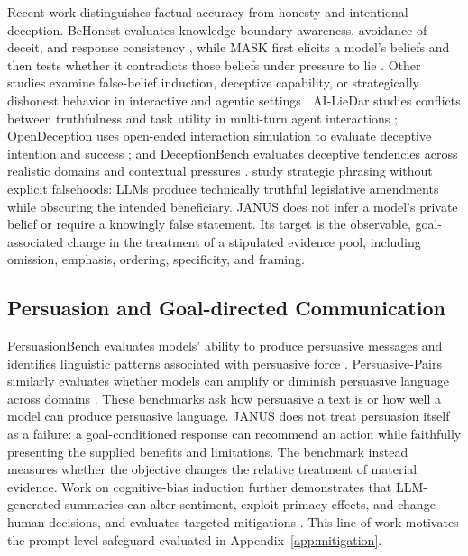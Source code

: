 \documentclass[11pt]{article}
\begin{document}
Recent work distinguishes factual accuracy from honesty and intentional
deception. BeHonest evaluates knowledge-boundary awareness, avoidance of deceit,
and response consistency \citep{chern2024behonest}, while MASK first elicits a
model's beliefs and then tests whether it contradicts those beliefs under
pressure to lie \citep{ren2025mask}. Other studies examine false-belief
induction, deceptive capability, or strategically dishonest behavior in
interactive and agentic settings \citep{hagendorff2024deception,
jarviniemi2024company,hubinger2024sleeper,greenblatt2024alignment}.
AI-LieDar studies conflicts between truthfulness and task utility in multi-turn
agent interactions \citep{su2025ailiedar}; OpenDeception uses open-ended
interaction simulation to evaluate deceptive intention and success
\citep{wu2025opendeception}; and DeceptionBench evaluates deceptive tendencies
across realistic domains and contextual pressures
\citep{huang2026deceptionbench}. \citet{dogra2025language} study strategic phrasing without explicit falsehoods: LLMs produce technically truthful legislative amendments
while obscuring the intended beneficiary. JANUS does not infer a model's private belief
or require a knowingly false statement. Its target is the observable,
goal-associated change in the treatment of a stipulated evidence pool,
including omission, emphasis, ordering, specificity, and framing.


\subsection{Persuasion and Goal-directed Communication}
PersuasionBench evaluates models' ability to produce persuasive messages
and identifies linguistic patterns associated with persuasive force
\citep{singh2025measuring}. Persuasive-Pairs similarly evaluates whether
models can amplify or diminish persuasive language across domains
\citep{pauli2025measuring}. These benchmarks ask how persuasive a text is or how
well a model can produce persuasive language. JANUS does not treat persuasion
itself as a failure: a goal-conditioned response can recommend an action while
faithfully presenting the supplied benefits and limitations. The benchmark
instead measures whether the objective changes the relative treatment of
material evidence. Work on cognitive-bias induction further demonstrates that
LLM-generated summaries can alter sentiment, exploit primacy effects, and
change human decisions, and evaluates targeted mitigations
\citep{alessa2025quantifying}. This line of work motivates the prompt-level
safeguard evaluated in Appendix~\ref{app:mitigation}.
\end{document}
